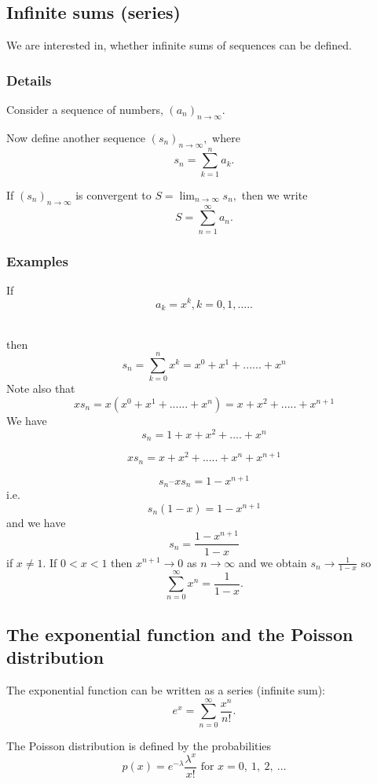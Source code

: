 \documentclass[12pt,a4paper]{article}
\theoremstyle{regla}
\theoremstyle{remark}
\theoremstyle{definition}
\theoremstyle{nonumberbreak}
\begin{document}
\subsection{Infinite sums (series)}
\begin{fbox}
\begin{minipage}{0.97\textwidth}
We are interested in, whether infinite sums of sequences can be defined. 
\end{minipage}
\end{fbox}
\subsubsection{Details}
Consider a sequence of numbers, $(a_n)_{n\to\infty}$. 

Now define another sequence $(s_n)_{n\to\infty},$ where 
$$s_n=\sum_{k=1}^na_k.$$

 
If $(s_n)_ {n\to\infty}$ is convergent to $S=\lim_{n\to\infty}s_n,$ then we write 
$$S=\sum_{n=1}^{\infty}a_n.$$

 



\subsubsection{Examples}
\begin{xmpl}
If $$a_k = x^k, k=0,1,.....$$

\\ then 
$$s_n=\sum_{k=0}^{n}x^k=x^0+x^1+......+x^n$$
Note also that
$$xs_n=x(x^0+x^1+......+x^n)= x + x^2 + ..... + x^{n+1}$$
We have
$$s_n = 1 + x + x^2 + .... + x^n$$

$$xs_n = x + x^2 + ..... +x^n + x^{n+1}$$

$$s_n – xs_n = 1 - x^{n+1}$$
i.e.
$$s_n(1-x) = 1-x^{n+1}$$
and we have
	$$s_n =\frac{1-x^{n+1}}{1-x}$$
if $x\neq1$. 
If $0< x<1$ then $x^{n+1}\to 0$ as $n\to\infty$ and we obtain $s_n\to\frac{1}{1-x}$ so 
$$\sum_{n=0}^{\infty}x^n=\frac{1}{1-x}.$$
\end{xmpl}

\subsection{The exponential function and the Poisson distribution}
\begin{fbox}
\begin{minipage}{0.97\textwidth}
The exponential function can be written as a series (infinite sum):
$$e^x=\sum_{n=0}^{\infty}\frac{x^n}{n!}.$$

 

The Poisson distribution is defined by the probabilities 
$$p(x)=e^{-\lambda}\frac{\lambda^x}{x!}\textrm{ for } x=0,\ 1,\ 2,\ \ldots$$

 

\end{minipage}
\end{fbox}
\end{document}
